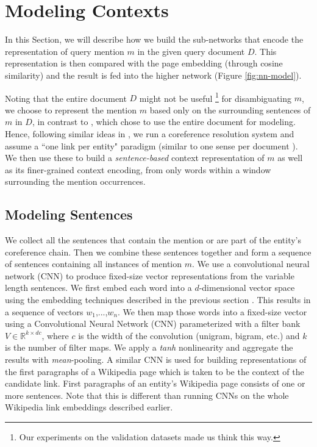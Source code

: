 \documentclass[letterpaper]{article} \usepackage{aaai18}  \usepackage{times}  \usepackage{helvet}  \usepackage{courier}  \usepackage{url}  \usepackage{graphicx}  \frenchspacing  \setlength{\pdfpagewidth}{8.5in}  \setlength{\pdfpageheight}{11in}  \usepackage{latexsym}
\begin{document}
%
 \section{Modeling Contexts}
\label{sec:repr-details}
In this Section, we will describe how we build the sub-networks that encode the representation of query mention $m$ in the given query document $D$. This representation is then compared with the page embedding (through cosine similarity) and the result is fed into the higher network (Figure \ref{fig:nn-model}).

Noting that the entire document $D$ might not be useful \footnote{Our experiments on the validation datasets made us think this way.} for disambiguating $m$, we choose to represent the mention $m$ based only on the surrounding sentences of $m$ in $D$, in contrast to \cite{he2013learning,berkeleyNNEL}, which chose to use the entire document for modeling.
Hence, following similar ideas in \cite{barrena2014one,lee2012joint}, we run a coreference resolution system \cite{luo2004mention} and assume a ``one link per entity" paradigm (similar to one sense per document \cite{gale1992one,yarowsky1993one}). We then use these to build a \emph{sentence-based} context representation of $m$ as well as its finer-grained context encoding, from only words within a window surrounding the mention occurrences. 


\subsection{Modeling Sentences}
\label{sentence-repr}
We collect all the sentences that contain the mention or are part of the entity's coreference chain. Then we combine these sentences together and form a sequence of sentences containing all instances of mention $m$. We use a convolutional neural network (CNN) to produce fixed-size vector representations from the variable length sentences.
We first embed each word into a $d$-dimensional vector space using the embedding techniques described in the previous section . This results in  a sequence of vectors $w_1$,...,$w_n$. We then map those words into a fixed-size vector using a Convolutional Neural Network (CNN) parameterized with a filter bank $V \in \mathbb{R}^{k \times dc}$, where $c$ is the width of the convolution (unigram, bigram, etc.) and $k$ is the number of filter maps. We apply a \textit{tanh} nonlinearity and aggregate the results with \textit{mean}-pooling. A similar CNN is used for building representations of the first paragraphs of a Wikipedia page which is taken to be the context of the candidate link. First paragraphs of an entity's Wikipedia page consists of one or more sentences. Note that this is different than running CNNs on the whole Wikipedia link embeddings described earlier.
\end{document}
